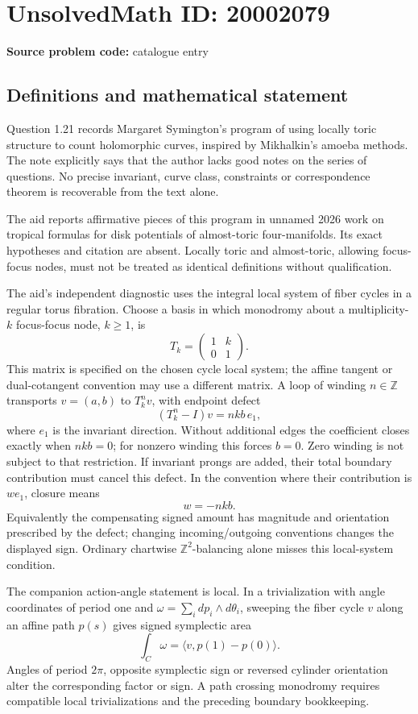 \documentclass[11pt]{article}
\begin{document}
\section*{UnsolvedMath ID: 20002079}
\textbf{Source problem code:} catalogue entry
\subsection{Definitions and mathematical statement}
Question 1.21 records Margaret Symington's program of using locally toric structure to count holomorphic curves, inspired by Mikhalkin's amoeba methods. The note explicitly says that the author lacks good notes on the series of questions. No precise invariant, curve class, constraints or correspondence theorem is recoverable from the text alone.

The aid reports affirmative pieces of this program in unnamed 2026 work on tropical formulas for disk potentials of almost-toric four-manifolds. Its exact hypotheses and citation are absent. Locally toric and almost-toric, allowing focus-focus nodes, must not be treated as identical definitions without qualification.

The aid's independent diagnostic uses the integral local system of fiber cycles in a regular torus fibration. Choose a basis in which monodromy about a multiplicity-\(k\) focus-focus node, \(k\geq1\), is
\[
 T_k=\begin{pmatrix}1&k\\0&1\end{pmatrix}.
\]
This matrix is specified on the chosen cycle local system; the affine tangent or dual-cotangent convention may use a different matrix. A loop of winding \(n\in\mathbb Z\) transports \(v=(a,b)\) to \(T_k^nv\), with endpoint defect
\[
 (T_k^n-I)v=nkb\,e_1,
\]
where \(e_1\) is the invariant direction. Without additional edges the coefficient closes exactly when \(nkb=0\); for nonzero winding this forces \(b=0\). Zero winding is not subject to that restriction. If invariant prongs are added, their total boundary contribution must cancel this defect. In the convention where their contribution is \(w e_1\), closure means
\[
 w=-nkb.
\]
Equivalently the compensating signed amount has magnitude and orientation prescribed by the defect; changing incoming/outgoing conventions changes the displayed sign. Ordinary chartwise \(\mathbb Z^2\)-balancing alone misses this local-system condition.

The companion action-angle statement is local. In a trivialization with angle coordinates of period one and
\(\omega=\sum_i dp_i\wedge d\theta_i\), sweeping the fiber cycle \(v\) along an affine path \(p(s)\) gives signed symplectic area
\[
 \int_C\omega=\langle v,p(1)-p(0)\rangle.
\]
Angles of period \(2\pi\), opposite symplectic sign or reversed cylinder orientation alter the corresponding factor or sign. A path crossing monodromy requires compatible local trivializations and the preceding boundary bookkeeping.
\end{document}
